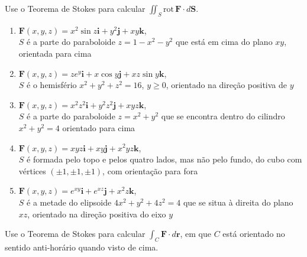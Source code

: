 \documentclass[a4paper, 12pt]{article}
\begin{document}
	
	
	\vspace{5mm}
	
	Use o Teorema de Stokes para calcular $\displaystyle \iint_S \mathrm{rot} \, \textbf{F} \cdot d\textbf{S}$.
	
	\begin{enumerate}
		
		\item $\textbf{F}(x,y,z) = x^{2}\sin{z}\textbf{i} + y^{2}\textbf{j} + xy\textbf{k}$, \\ $S$ é a parte do paraboloide $z = 1 - x^2 - y^2$ que está em cima do plano $xy$, orientada para cima

		\item $\textbf{F}(x,y,z) = ze^{y}\textbf{i} + x\cos{y}\textbf{j} + xz\sin{y}\textbf{k}$, \\ $S$ é o hemisfério $x^2 + y^2 + z^2 = 16$, $y \geq 0$, orientado na direção positiva de $y$
		\resposta{$16\pi$}

		\item $\textbf{F}(x,y,z) = x^{2}z^{2}\textbf{i} + y^{2}z^{2}\textbf{j} + xyz\textbf{k}$, \\ $S$ é a parte do paraboloide $z = x^2 + y^2$ que se encontra dentro do cilindro $x^2 + y^2 = 4$ orientado para cima
		\resposta{\fazer}

		\item $\textbf{F}(x,y,z) = xyz\textbf{i} + xy\textbf{j} + x^{2}yz\textbf{k}$, \\ $S$ é formada pelo topo e pelos quatro lados, mas não pelo fundo, do cubo com vértices $(\pm 1, \pm 1, \pm 1)$, com orientação para fora

		\item $\textbf{F}(x,y,z) = e^{xy}\textbf{i} + e^{xz}\textbf{j} + x^{2}z\textbf{k}$, \\ $S$ é a metade do elipsoide $4x^2 + y^2 + 4z^2 = 4$ que se situa à direita do plano $xz$, orientado na direção positiva do eixo $y$

	\end{enumerate}
	
	\vspace{5mm}
	
	Use o Teorema de Stokes para calcular $\displaystyle \int_C \textbf{F} \cdot d\textbf{r}$, em que $C$ está orientado no sentido anti-horário quando visto de cima.
	
\end{document}
